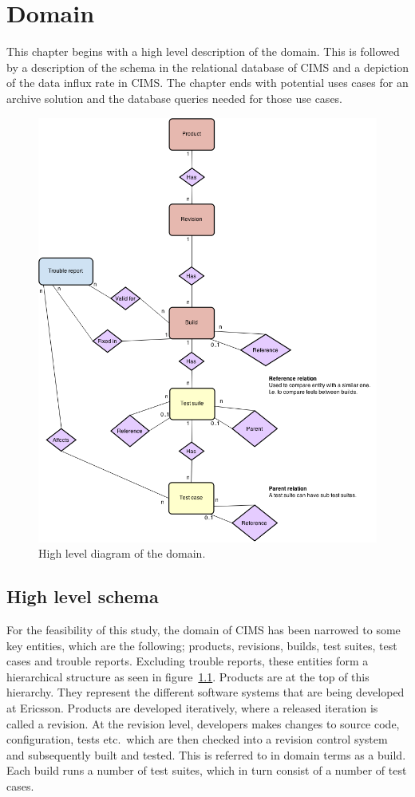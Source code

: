 \chapter{Domain}
\label{chap:domain}

This chapter begins with a high level description of the domain. This is followed by a description of the schema in the relational database of CIMS and a depiction of the data influx rate in CIMS. The chapter ends with potential uses cases for an archive solution and the database queries needed for those use cases.
\begin{figure}[h!]
\centering
\includegraphics[scale=0.5]{figure/er_diagram.png}
\caption{High level diagram of the domain.}
\label{fig:er}
\end{figure}

\section{High level schema}
For the feasibility of this study, the domain of CIMS has been narrowed to some key entities, which are the following; products, revisions, builds, test suites, test cases and trouble reports. Excluding trouble reports, these entities form a hierarchical structure as seen in figure~\ref{fig:er}. Products are at the top of this hierarchy. They represent the different software systems that are being developed at Ericsson. Products are developed iteratively, where a released iteration is called a revision. At the revision level, developers makes changes to source code, configuration, tests etc.\ which are then checked into a revision control system and subsequently built and tested. This is referred to in domain terms as a build. Each build runs a number of test suites, which in turn consist of a number of test cases.

